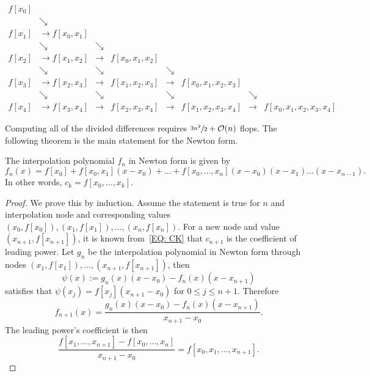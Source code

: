 \begin{tcolorbox}
\vspace{0.2cm}
    \begin{equation}\label{EQ: ALG NEWTON}
    \begin{aligned}
        f[x_0] &               &\\ 
               &\searrow       &\\ 
        f[x_1] &\to f[x_0, x_1]& \\
               &\searrow        &\searrow&\\ 
        f[x_2] & \to f[x_1, x_2]&\to& f[x_0, x_1, x_2]\\
               &\searrow        &\searrow& &\searrow&\\ 
        f[x_3] &\to f[x_2, x_3] &\to& f[x_1, x_2, x_3] &\to & f[x_0, x_1, x_2, x_3]\\
               &\searrow        &\searrow & &\searrow&  &\searrow &\\ 
        f[x_4] & \to f[x_3, x_4]&\to& f[x_2, x_3, x_4] &\to & f[x_1, x_2, x_3, x_4] &\to&  f[x_0, x_1, x_2, x_3, x_4] 
    \end{aligned}
\end{equation}
\end{tcolorbox}
Computing all of the divided differences requires $\sfrac{3n^2}{2} +\mathcal O(n)$ flops. The following theorem is the main statement for the Newton form.
\begin{theorem}
\label{Thm: 2-New-for}
    The interpolation polynomial $f_n$ in Newton form is given by 
    \begin{equation}
        f_n(x) = f[x_0] + f[x_0, x_1](x-x_0) + \dots + f[x_0, \dots, x_n](x - x_0)(x - x_1)\dots (x - x_{n-1}).
    \end{equation}
    In other words, $c_k = f[x_0, \dots, x_k]$.
\end{theorem}
\begin{proof}
    We prove this by induction. Assume the statement is true for $n$ and interpolation node and corresponding values $(x_0, f[x_0]), (x_1, f[x_1]), \dots, (x_n, f[x_n])$. For a new node and value $(x_{n+1}, f[x_{n+1}])$, it is known from~\eqref{EQ: CK} that $c_{n+1}$ is the coefficient of leading power. Let $g_n$ be the interpolation polynomial in Newton form through nodes $(x_1, f[x_1]), \dots, (x_{n+1}, f[x_{n+1}])$, then 
    $$\psi(x)  := g_n(x)(x - x_0) - f_n(x)(x - x_{n+1})$$
    satisfies that $\psi(x_j) = f[x_j](x_{n+1} - x_0)$ for $0\le j\le {n+1}$. Therefore 
    \begin{equation}
        f_{n+1}(x) = \frac{g_n(x)(x - x_0) - f_n(x)(x - x_{n+1})}{x_{n+1} - x_0}.
    \end{equation}
    The leading power's coefficient is then 
    \begin{equation}
        \frac{f[x_1, \dots, x_{n+1}] - f[x_0, \dots, x_n]}{x_{n+1} - x_0} = f[x_0, x_1,\dots, x_{n+1}].
    \end{equation}
\end{proof}
